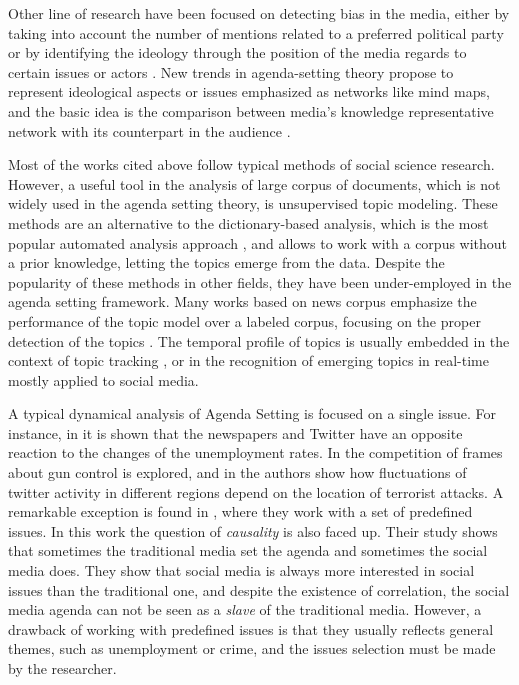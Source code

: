 \documentclass[a4paper, 12pt]{article}
\begin{document}
\par Other line of research have been focused on detecting bias in the media, either by taking into account the number of mentions related  to a preferred political party \cite{lazaridou2016identifying, baumgartner2015all} or by identifying the ideology through the position of the media regards to certain issues or actors \cite{elejalde2018nature, sagarzazu2017hugo}. New trends in agenda-setting theory propose to represent ideological aspects or issues emphasized as networks like mind maps, and the basic idea is the comparison between media's knowledge representative network with its counterpart in the audience \cite{guo2012application, vu2014exploring}.


\par Most of the works cited above follow typical methods of social science research. However, a useful tool in the analysis of large corpus of documents, which is not widely used in the agenda setting theory, is unsupervised topic modeling. These methods are an alternative to the dictionary-based analysis, which is the most popular automated analysis approach \cite{guo2016big}, and allows to work with a corpus without a prior knowledge, letting the topics emerge from the data. Despite the popularity of these methods in other fields, they have been under-employed in the agenda setting framework.
Many works based on news corpus emphasize the performance of the topic model over a labeled corpus, focusing on the proper detection of the topics \cite{dai2010online, po2016topic, brun2000experiment}. The temporal profile of topics is usually embedded in the context of topic tracking \cite{hu2016news, li2017joint}, or in the recognition of emerging topics in real-time \cite{cataldi2010emerging} mostly applied to social media. 

\par A typical dynamical analysis of Agenda Setting is focused on a single issue. For instance, in \cite{soroka2017negativity} it is shown that the newspapers and Twitter have an opposite reaction to the changes of the unemployment rates. In \cite{guggenheim2015dynamics} the competition of frames about gun control is explored, and in \cite{ali2018measuring} the authors show how fluctuations of  twitter activity in different regions depend on the location of terrorist attacks.
A remarkable exception is found in  \cite{russell2014dynamics}, where they work with a set of predefined issues. In this work the question of \emph{causality} is also faced up. Their study shows that sometimes the traditional media set the agenda and sometimes the social media does. They show that social media is always more interested in social issues than the traditional one, and despite the existence of correlation, the social media agenda can not be seen as a \emph{slave} of the traditional media.
However, a drawback of working with predefined issues is that they usually reflects general themes, such as unemployment or crime, and the issues selection must be made by the researcher. 
\end{document}
